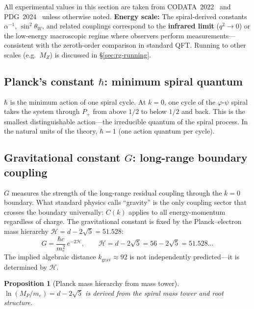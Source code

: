 \documentclass[12pt,a4paper]{article}
\newtheorem{proposition}[theorem]{Proposition}
\begin{document}
All experimental values in this section are taken from CODATA~2022~\cite{CODATA2022} and PDG~2024~\cite{PDG2024} unless otherwise noted. \textbf{Energy scale:} The spiral-derived constants $\alpha^{-1}$, $\sin^2\theta_W$, and related couplings correspond to the \textbf{infrared limit} ($q^2 \to 0$) or the low-energy macroscopic regime where observers perform measurements---consistent with the zeroth-order comparison in standard QFT. Running to other scales (e.g.\ $M_Z$) is discussed in \S\ref{sec:rg-running}.

\subsection{Planck's constant $\hbar$: minimum spiral quantum}

$\hbar$ is the minimum action of one spiral cycle. At $k = 0$, one cycle of the $\varphi$-$\psi$ spiral takes the system through $P_+$ from above $1/2$ to below $1/2$ and back. This is the smallest distinguishable action---the irreducible quantum of the spiral process. In the natural units of the theory, $\hbar = 1$ (one action quantum per cycle).

\subsection{Gravitational constant $G$: long-range boundary coupling}

$G$ measures the strength of the long-range residual coupling through the $k = 0$ boundary.  What standard physics calls ``gravity'' is the only coupling sector that crosses the boundary universally: $C(k)$ applies to all energy-momentum regardless of charge.  The gravitational constant is fixed by the Planck--electron mass hierarchy $\mathcal{H} = d - 2\sqrt{5} = 51.528$:
\begin{equation}
G = \frac{\hbar c}{m_e^2}\,e^{-2\mathcal{H}}, \qquad \mathcal{H} = d - 2\sqrt{5} = 56 - 2\sqrt{5} = 51.528\ldots
\end{equation}
The implied algebraic distance $k_{\mathrm{grav}} \approx 92$ is not independently predicted---it is determined by $\mathcal{H}$.

\begin{proposition}[Planck mass hierarchy from mass tower]
\label{prop:planck-hierarchy}
$\ln(M_P/m_e) = d - 2\sqrt{5}$ is derived from the spiral mass tower and root structure.
\end{proposition}
\end{document}
